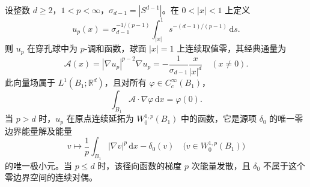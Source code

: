\begin{proposition}
\label{b2:prop:H2-radial-point-source}
设整数 \(d\ge2\)，\(1<p<\infty\)，\(\sigma_{d-1}=|S^{d-1}|\)。在 \(0<|x|<1\) 上定义
\[
 u_p(x)=\sigma_{d-1}^{-1/(p-1)}
           \int_{|x|}^1s^{-(d-1)/(p-1)}\,\mathrm ds.
\]
则 \(u_p\) 在穿孔球中为 \(p\)-调和函数，球面 \(|x|=1\) 上连续取值零，其经典通量为
\[
 \mathcal A(x)=|\nabla u_p|^{p-2}\nabla u_p
       =-\frac1{\sigma_{d-1}}\frac{x}{|x|^d}
 \quad(x\ne0).
\]
此向量场属于 \(L^1(B_1;\mathbb R^d)\)，且对所有 \(\varphi\in C_c^\infty(B_1)\)，
\[
 \int_{B_1}\mathcal A\cdot\nabla\varphi\,\mathrm dx=\varphi(0).
\]
当 \(p>d\) 时，\(u_p\) 在原点连续延拓为 \(W_0^{1,p}(B_1)\) 中的函数，它是源项 \(\delta_0\) 的唯一零边界能量解及能量
\[
 v\longmapsto\frac1p\int_{B_1}|\nabla v|^p\,\mathrm dx-\delta_0(v)
 \quad\bigl(v\in W_0^{1,p}(B_1)\bigr)
\]
的唯一极小元。当 \(p\le d\) 时，该径向函数的梯度 \(p\) 次能量发散，且 \(\delta_0\) 不属于这个零边界空间的连续对偶。
\end{proposition}
